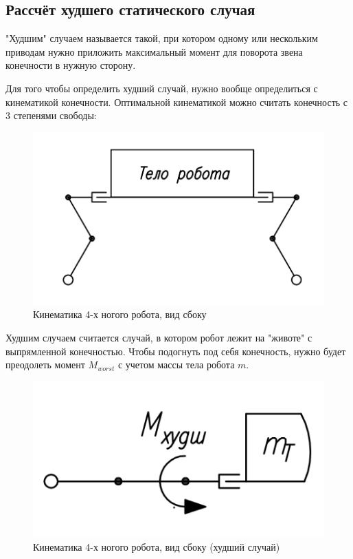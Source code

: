 \subsection{Рассчёт худшего статического случая}

"Худшим" случаем называется такой, при котором одному или нескольким приводам нужно приложить максимальный момент для поворота звена конечности в нужную сторону.

Для того чтобы определить худший случай, нужно вообще определиться с кинематикой конечности. Оптимальной кинематикой можно считать конечность с 3 степенями свободы:

\begin{figure}[ht]
    \centering
    \includegraphics[scale=0.7]{kin1.png}
    \caption{Кинематика 4-х ногого робота, вид сбоку}
\end{figure}

Худшим случаем считается случай, в котором робот лежит на "животе" с выпрямленной конечностью. Чтобы подогнуть под себя конечность, нужно будет преодолеть момент $M_{worst}$ с учетом массы тела робота $m$.

\begin{figure}[ht]
    \centering
    \includegraphics[scale=1]{kin2.png}
    \caption{Кинематика 4-х ногого робота, вид сбоку (худший случай)}
\end{figure}

